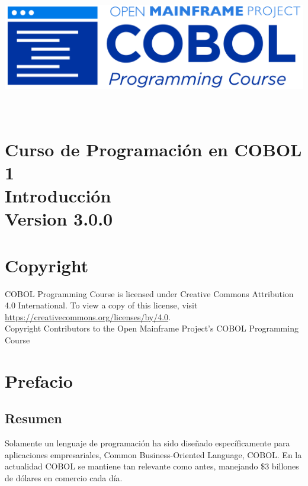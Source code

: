 \begin{center}
  \vspace*{25pt}
\includegraphics{Images/COBOL-Programming-Course.png}
\hypertarget{cobol-programming-course-1}{%
\section*{
  \\[35pt]
  \Huge Curso de Programación en COBOL 1 \\[10pt]
  \Huge Introducción \\[15pt]
  \Large Version 3.0.0}\label{cobol-programming-course-1}}
\end{center}

\pagebreak
\hypertarget{copyright}{%
\section*{Copyright}{
  \normalsize COBOL Programming Course is licensed under Creative Commons 
  Attribution 4.0 International. To view a copy of this license, visit 
  \href{https://creativecommons.org/licenses/by/4.0}{https://creativecommons.org/licenses/by/4.0}. \\[10pt]
  Copyright Contributors to the Open Mainframe Project's COBOL Programming Course}\label{copyright}}
\pagebreak

\hypertarget{preface}{%
\section*{Prefacio}\label{preface}}

\hypertarget{abstract}{%
\subsection*{Resumen}\label{abstract}}

Solamente un lenguaje de programación ha sido diseñado específicamente 
para aplicaciones empresariales, Common Business-Oriented Language, COBOL.
En la actualidad COBOL se mantiene tan relevante como antes, manejando
\$3 billones de dólares en comercio cada día.

